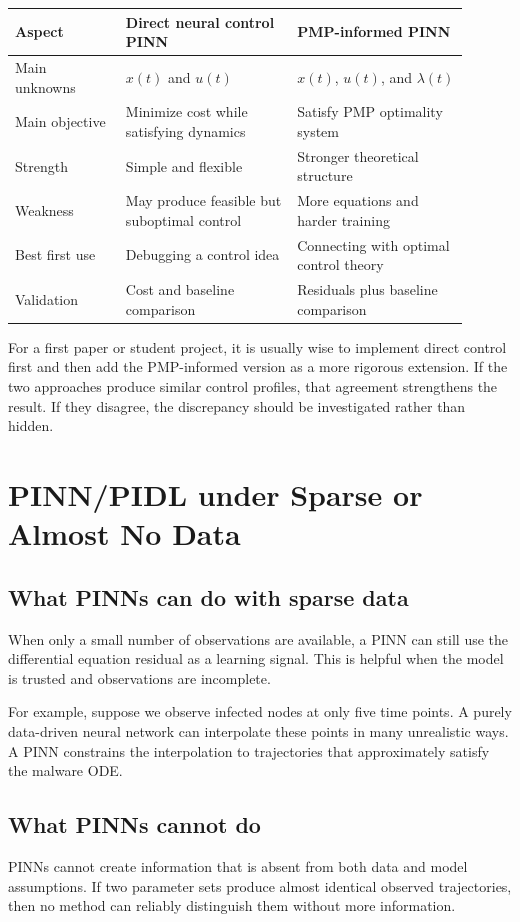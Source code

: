 \documentclass[11pt,a4paper]{article}
\begin{document}
\begin{longtable}{p{0.22\linewidth}p{0.34\linewidth}p{0.34\linewidth}}
\toprule
Aspect & Direct neural control PINN & PMP-informed PINN \\
\midrule
Main unknowns & $x(t)$ and $u(t)$ & $x(t)$, $u(t)$, and $\lambda(t)$ \\
Main objective & Minimize cost while satisfying dynamics & Satisfy PMP optimality system \\
Strength & Simple and flexible & Stronger theoretical structure \\
Weakness & May produce feasible but suboptimal control & More equations and harder training \\
Best first use & Debugging a control idea & Connecting with optimal control theory \\
Validation & Cost and baseline comparison & Residuals plus baseline comparison \\
\bottomrule
\end{longtable}

For a first paper or student project, it is usually wise to implement direct control first and then add the PMP-informed version as a more rigorous extension. If the two approaches produce similar control profiles, that agreement strengthens the result. If they disagree, the discrepancy should be investigated rather than hidden.

\section{PINN/PIDL under Sparse or Almost No Data}

\subsection{What PINNs can do with sparse data}
When only a small number of observations are available, a PINN can still use the differential equation residual as a learning signal. This is helpful when the model is trusted and observations are incomplete.

For example, suppose we observe infected nodes at only five time points. A purely data-driven neural network can interpolate these points in many unrealistic ways. A PINN constrains the interpolation to trajectories that approximately satisfy the malware ODE.

\subsection{What PINNs cannot do}
PINNs cannot create information that is absent from both data and model assumptions. If two parameter sets produce almost identical observed trajectories, then no method can reliably distinguish them without more information.
\end{document}
